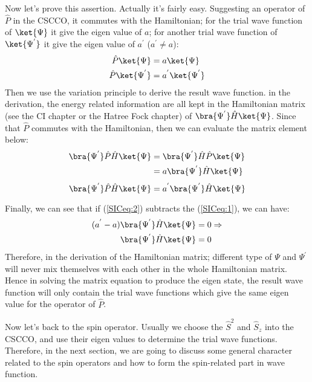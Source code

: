 Now let's prove this assertion. Actually it's fairly easy.  Suggesting
an operator of $\hat{P}$ in the CSCCO, it commutes with the
Hamiltonian; for the trial wave function of $\ket{\Psi}$ it give the
eigen value of $a$; for another trial wave function of
$\ket{\Psi^{'}}$ it give the eigen value of $a^{'}$ ($a^{'} \neq a$):
\begin{align}\label{}
\hat{P}\ket{\Psi}     &= a\ket{\Psi} \nonumber \\
\hat{P}\ket{\Psi^{'}} &= a^{'}\ket{\Psi^{'}}
\end{align}
Then we use the variation principle to derive the result wave
function. in the derivation, the energy related information are all
kept in the Hamiltonian matrix (see the CI chapter or the Hatree Fock
chapter) of $\bra{\Psi^{'}}\hat{H}\ket{\Psi}$. Since that $\hat{P}$
commutes with the Hamiltonian, then we can evaluate the matrix element
below:
\begin{align}\label{SICeq:1}
\bra{\Psi^{'}}\hat{P}\hat{H}\ket{\Psi} &=
\bra{\Psi^{'}}\hat{H}\hat{P}\ket{\Psi} \nonumber \\
&=a\bra{\Psi^{'}}\hat{H}\ket{\Psi}
\end{align}
\begin{equation}\label{SICeq:2}
\bra{\Psi^{'}}\hat{P}\hat{H}\ket{\Psi}
=a^{'}\bra{\Psi^{'}}\hat{H}\ket{\Psi}
\end{equation}

Finally, we can see that if (\ref{SICeq:2}) subtracts the
(\ref{SICeq:1}), we can have:
\begin{align}\label{}
(a^{'}-a)\bra{\Psi^{'}}\hat{H}\ket{\Psi} &= 0 \Rightarrow \nonumber \\
\bra{\Psi^{'}}\hat{H}\ket{\Psi} &= 0
\end{align}
Therefore, in the derivation of the Hamiltonian matrix; different type
of $\Psi$ and $\Psi^{'}$ will never mix themselves with each other in
the whole Hamiltonian matrix. Hence in solving the matrix equation to
produce the eigen state, the result wave function will only contain
the trial wave functions which give the same eigen value for the
operator of $\hat{P}$.

Now let's back to the spin operator. Usually we choose the
$\hat{S}^{2}$ and $\hat{S}_{z}$ into the CSCCO, and use their eigen
values to determine the trial wave functions. Therefore, in the
next section, we are going to discuss some general character related
to the spin operators and how to form the spin-related part in wave
function.


